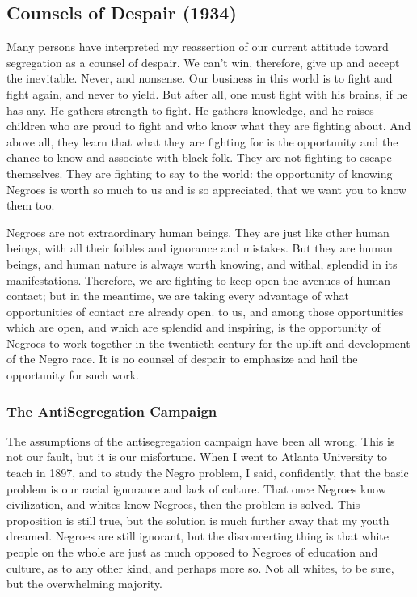 \documentclass[letterpaper,10pt,english]{jupyterBook}
\begin{document}
\subsection{Counsels of Despair (1934)}
\label{\detokenize{Volumes/41/06/counsels_of_despair:counsels-of-despair-1934}}\label{\detokenize{Volumes/41/06/counsels_of_despair::doc}}
\sphinxAtStartPar
Many persons have interpreted my reassertion of our current attitude toward segregation as a counsel of despair. We can’t win, therefore, give up and accept the inevitable. Never, and nonsense. Our business in this world is to fight and fight again, and never to yield. But after all, one must fight with his brains, if he has any. He gathers strength to fight. He gathers knowledge, and he raises children who are proud to fight and who know what they are fighting about. And above all, they learn that what they are fighting for is the opportunity and the chance to know and associate with black folk. They are not fighting to escape themselves. They are fighting to say to the world: the opportunity of knowing Negroes is worth so much to us and is so appreciated, that we want you to know them too.

\sphinxAtStartPar
Negroes are not extraordinary human beings. They are just like other human beings, with all their foibles and ignorance and mistakes. But they are human beings, and human nature is always worth knowing, and withal, splendid in its manifestations. Therefore, we are fighting to keep open the avenues of human contact; but in the meantime, we are taking every advantage of what opportunities of contact are already open. to us, and among those opportunities which are open, and which are splendid and inspiring, is the opportunity of Negroes to work together in the twentieth century for the uplift and development of the Negro race. It is no counsel of despair to emphasize and hail the opportunity for such work.


\subsubsection{The Anti\sphinxhyphen{}Segregation Campaign}
\label{\detokenize{Volumes/41/06/counsels_of_despair:the-anti-segregation-campaign}}
\sphinxAtStartPar
The assumptions of the anti\sphinxhyphen{}segregation campaign have been all wrong. This is not our fault, but it is our misfortune. When I went to Atlanta University to teach in 1897, and to study the Negro problem, I said, confidently, that the basic problem is our racial ignorance and lack of culture. That once Negroes know civilization, and whites know Negroes, then the problem is solved. This proposition is still true, but the solution is much further away that my youth dreamed. Negroes are still ignorant, but the disconcerting thing is that white people on the whole are just as much opposed to Negroes of education and culture, as to any other kind, and perhaps more so. Not all whites, to be sure, but the overwhelming majority.
\end{document}
